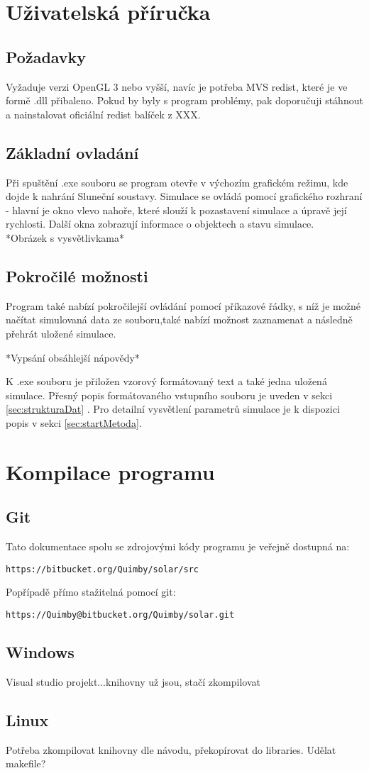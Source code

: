 \chapter{Uživatelská příručka}
\label{chap:userGuide}
\section{Požadavky}
Vyžaduje verzi OpenGL 3 nebo vyšší, navíc je potřeba MVS redist, které je ve formě .dll přibaleno. Pokud by byly s program problémy, pak doporučuji stáhnout  a nainstalovat oficiální redist balíček z XXX.
\section{Základní ovladání}
Při spuštění .exe souboru se program otevře v výchozím grafickém režimu, kde dojde k nahrání Sluneční soustavy. Simulace se ovládá pomocí grafického rozhraní - hlavní je okno vlevo nahoře, které slouží k pozastavení simulace a úpravě její rychlosti. Další okna zobrazují informace o objektech a stavu simulace.\\
*Obrázek s vysvětlivkama*\\
\section{Pokročilé možnosti}
Program také nabízí pokročilejší ovládání pomocí příkazové řádky, s níž je možné načítat simulovaná data ze souboru,také nabízí možnost zaznamenat a následně přehrát uložené simulace.

*Vypsání obsáhlejší nápovědy*

K .exe souboru je přiložen vzorový formátovaný text a také jedna uložená simulace.
Přesný popis formátovaného vstupního souboru je uveden v sekci \ref{sec:strukturaDat} . Pro detailní vysvětlení parametrů simulace je k dispozici popis v sekci \ref{sec:startMetoda}.



\chapter{Kompilace programu}
\section{Git}
Tato dokumentace spolu se zdrojovými kódy programu je veřejně dostupná na:
\begin{center}
\texttt{https://bitbucket.org/Quimby/solar/src}
\end{center}
Popřípadě přímo stažitelná pomocí git:
\begin{center}
	\texttt{https://Quimby@bitbucket.org/Quimby/solar.git}
\end{center}
\section{Windows}
Visual studio projekt...knihovny už jsou, stačí zkompilovat
\section{Linux}
Potřeba zkompilovat knihovny dle návodu, překopírovat do libraries.
Udělat makefile?